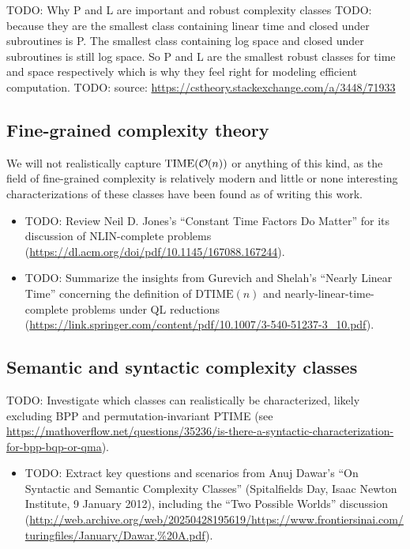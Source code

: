 TODO: Why P and L are important and robust complexity classes
TODO: because they are the smallest class containing linear time and closed under subroutines is P. The smallest class containing log space and closed under subroutines is still log space. So P and L are the smallest robust classes for time and space respectively which is why they feel right for modeling efficient computation.  
TODO: source: \url{https://cstheory.stackexchange.com/a/3448/71933}

\subsection{Fine-grained complexity theory}
We will not realistically capture $\text{TIME}(\bigO(n))$ or anything of this kind,
as the field of fine-grained complexity is relatively modern and little or none interesting
characterizations of these classes have been found as of writing this work.
\begin{itemize}
\item TODO: Review Neil D. Jones's ``Constant Time Factors Do Matter'' for its discussion of NLIN-complete problems (\url{https://dl.acm.org/doi/pdf/10.1145/167088.167244}).
\item TODO: Summarize the insights from Gurevich and Shelah's ``Nearly Linear Time'' concerning the definition of $\mathrm{DTIME}(n)$ and nearly-linear-time-complete problems under QL reductions (\url{https://link.springer.com/content/pdf/10.1007/3-540-51237-3_10.pdf}).
\end{itemize}

\subsection{Semantic and syntactic complexity classes}
TODO: Investigate which classes can realistically be characterized, likely excluding BPP and permutation-invariant PTIME (see \url{https://mathoverflow.net/questions/35236/is-there-a-syntactic-characterization-for-bpp-bqp-or-qma}).
\begin{itemize}

\item TODO: Extract key questions and scenarios from Anuj Dawar's ``On Syntactic and Semantic Complexity Classes'' (Spitalfields Day, Isaac Newton Institute, 9 January 2012), including the ``Two Possible Worlds'' discussion (\url{http://web.archive.org/web/20250428195619/https://www.frontiersinai.com/turingfiles/January/Dawar,%20A.pdf}).

\end{itemize}
